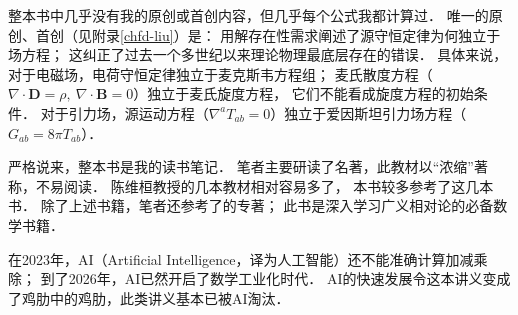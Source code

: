{\kaishu
    整本书中几乎没有我的原创或首创内容，但几乎每个公式我都计算过．
    唯一的原创、首创（见附录\ref{chfd-liu}）是：  
    用解存在性需求阐述了源守恒定律为何独立于场方程；
    这纠正了过去一个多世纪以来理论物理最底层存在的错误．
    具体来说，对于电磁场，电荷守恒定律独立于麦克斯韦方程组；
    麦氏散度方程（$\nabla\cdot \boldsymbol{D}=\rho,\ \nabla \cdot \boldsymbol{B}=0$）独立于麦氏旋度方程，
    它们不能看成旋度方程的初始条件．
    对于引力场，源运动方程（$\nabla^a T_{ab}=0$）独立于爱因斯坦引力场方程（$G_{ab}=8\pi T_{ab}$）．
}


严格说来，整本书是我的读书笔记．
笔者主要研读了\textcite{cc2001-zh}名著，此教材以“浓缩”著称，不易阅读．
陈维桓教授的几本教材\cite{chenwh2001,chen-li-2023-2ed-v1}相对容易多了，
本书较多参考了这几本书．
除了上述书籍，笔者还参考了\textcite{oneill1983}的专著；
此书是深入学习广义相对论的必备数学书籍．


在2023年，AI（Artificial Intelligence，译为人工智能）还不能准确计算加减乘除；
到了2026年，AI已然开启了数学工业化时代．
AI的快速发展令这本讲义变成了鸡肋中的鸡肋，此类讲义基本已被AI淘汰．


%
%

\vspace{1em}
%






